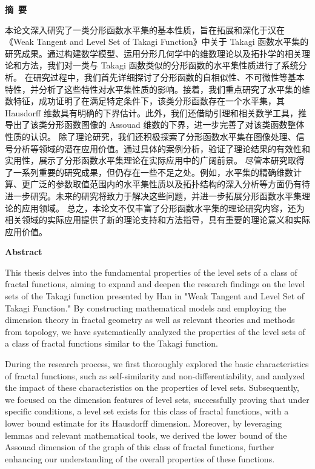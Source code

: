 \cleardoublepage{}
\begin{center}
    \bfseries {} 摘~要
\end{center}

本论文深入研究了一类分形函数水平集的基本性质，旨在拓展和深化于汉在《Weak Tangent and Level Set of Takagi Function》中关于 Takagi 函数水平集的研究成果。通过构建数学模型、运用分形几何学中的维数理论以及拓扑学的相关理论和方法，我们对一类与 Takagi 函数类似的分形函数的水平集性质进行了系统分析。
在研究过程中，我们首先详细探讨了分形函数的自相似性、不可微性等基本特性，并分析了这些特性对水平集性质的影响。接着，我们重点研究了水平集的维数特征，成功证明了在满足特定条件下，该类分形函数存在一个水平集，其 Hausdorff 维数具有明确的下界估计。此外，我们还借助引理和相关数学工具，推导出了该类分形函数图像的 Assouad 维数的下界，进一步完善了对该类函数整体性质的认识。
除了理论研究，我们还积极探索了分形函数水平集在图像处理、信号分析等领域的潜在应用价值。通过具体的案例分析，验证了理论结果的有效性和实用性，展示了分形函数水平集理论在实际应用中的广阔前景。
尽管本研究取得了一系列重要的研究成果，但仍存在一些不足之处。例如，水平集的精确维数计算、更广泛的参数取值范围内的水平集性质以及拓扑结构的深入分析等方面仍有待进一步研究。未来的研究将致力于解决这些问题，并进一步拓展分形函数水平集理论的应用领域。
总之，本论文不仅丰富了分形函数水平集的理论研究内容，还为相关领域的实际应用提供了新的理论支持和方法指导，具有重要的理论意义和实际应用价值。

\cleardoublepage{}
\begin{center}
    \bfseries {} Abstract
\end{center}

This thesis delves into the fundamental properties of the level sets of a class of fractal functions, aiming to expand and deepen the research findings on the level sets of the Takagi function presented by Han in "Weak Tangent and Level Set of Takagi Function." By constructing mathematical models and employing the dimension theory in fractal geometry as well as relevant theories and methods from topology, we have systematically analyzed the properties of the level sets of a class of fractal functions similar to the Takagi function.

During the research process, we first thoroughly explored the basic characteristics of fractal functions, such as self-similarity and non-differentiability, and analyzed the impact of these characteristics on the properties of level sets. Subsequently, we focused on the dimension features of level sets, successfully proving that under specific conditions, a level set exists for this class of fractal functions, with a lower bound estimate for its Hausdorff dimension. Moreover, by leveraging lemmas and relevant mathematical tools, we derived the lower bound of the Assouad dimension of the graph of this class of fractal functions, further enhancing our understanding of the overall properties of these functions.

